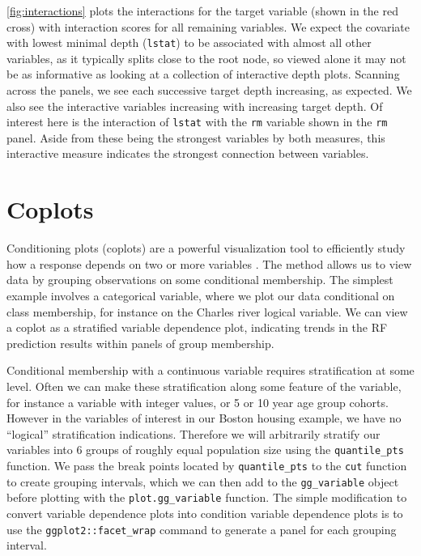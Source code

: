 \documentclass[article]{jss}
\begin{document}
\autoref{fig:interactions} plots the interactions for the target
variable (shown in the red cross) with interaction scores for all
remaining variables. We expect the covariate with lowest minimal depth
(\texttt{lstat}) to be associated with almost all other variables, as it
typically splits close to the root node, so viewed alone it may not be
as informative as looking at a collection of interactive depth plots.
Scanning across the panels, we see each successive target depth
increasing, as expected. We also see the interactive variables
increasing with increasing target depth. Of interest here is the
interaction of \texttt{lstat} with the \texttt{rm} variable shown in the
\texttt{rm} panel. Aside from these being the strongest variables by
both measures, this interactive measure indicates the strongest
connection between variables.

\section{Coplots}\label{coplots}

Conditioning plots (coplots)
\citep[\citet{cleveland:1993}]{chambers:1992} are a powerful
visualization tool to efficiently study how a response depends on two or
more variables \citep{cleveland:1993}. The method allows us to view data
by grouping observations on some conditional membership. The simplest
example involves a categorical variable, where we plot our data
conditional on class membership, for instance on the Charles river
logical variable. We can view a coplot as a stratified variable
dependence plot, indicating trends in the RF prediction results within
panels of group membership.

Conditional membership with a continuous variable requires
stratification at some level. Often we can make these stratification
along some feature of the variable, for instance a variable with integer
values, or 5 or 10 year age group cohorts. However in the variables of
interest in our Boston housing example, we have no ``logical''
stratification indications. Therefore we will arbitrarily stratify our
variables into 6 groups of roughly equal population size using the
\texttt{quantile\_pts} function. We pass the break points located by
\texttt{quantile\_pts} to the \texttt{cut} function to create grouping
intervals, which we can then add to the \texttt{gg\_variable} object
before plotting with the \texttt{plot.gg\_variable} function. The simple
modification to convert variable dependence plots into condition
variable dependence plots is to use the \texttt{ggplot2::facet\_wrap}
command to generate a panel for each grouping interval.
\end{document}
